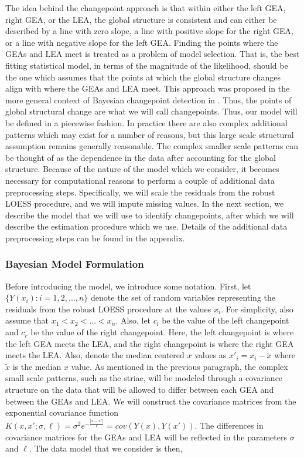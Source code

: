 \documentclass[12pt]{article}
\begin{document}
The idea behind the changepoint approach is that within either the left
GEA, right GEA, or the LEA, the global structure is consistent and can
either be described by a line with zero slope, a line with positive
slope for the right GEA, or a line with negative slope for the left GEA.
Finding the points where the GEAs and LEA meet is treated as a problem
of model selection. That is, the best fitting statistical model, in
terms of the magnitude of the likelihood, should be the one which
assumes that the points at which the global structure changes align with
where the GEAs and LEA meet. This approach was proposed in the more
general context of Bayesian changepoint detection in
\citet{stephens1994}. Thus, the points of global structural change are
what we will call changepoints. Thus, our model will be defined in a
piecewise fashion. In practice there are also complex additional
patterns which may exist for a number of reasons, but this large scale
structural assumption remains generally reasonable. The complex smaller
scale patterns can be thought of as the dependence in the data after
accounting for the global structure. Because of the nature of the model
which we consider, it becomes necessary for computational reasons to
perform a couple of additional data preprocessing steps. Specifically,
we will scale the residuals from the robust LOESS procedure, and we will
impute missing values. In the next section, we describe the model that
we will use to identify changepoints, after which we will describe the
estimation procedure which we use. Details of the additional data
preprocessing steps can be found in the appendix.

\subsubsection{Bayesian Model Formulation}

Before introducing the model, we introduce some notation. First, let
\(\{Y(x_i): i = 1,2, ..., n\}\) denote the set of random variables
representing the residuals from the robust LOESS procedure at the values
\(x_i\). For simplicity, also assume that \(x_1 < x_2 < ... < x_n\).
Also, let \(c_l\) be the value of the left changepoint and \(c_r\) be
the value of the right changepoint. Here, the left changepoint is where
the left GEA meets the LEA, and the right changepoint is where the right
GEA meets the LEA. Also, denote the median centered \(x\) values as
\(x'_i = x_i - \tilde{x}\) where \(\tilde{x}\) is the median \(x\)
value. As mentioned in the previous paragraph, the complex small scale
patterns, such as the striae, will be modeled through a covariance
structure on the data that will be allowed to differ between each GEA
and between the GEAs and LEA. We will construct the covariance matrices
from the exponential covariance function
\(K(x, x';\sigma, \ell) = \sigma^2 e^{-\frac{|x - x'|}{\ell}} = cov(Y(x), Y(x'))\).
The differences in covariance matrices for the GEAs and LEA will be
reflected in the parameters \(\sigma\) and \(\ell\). The data model that
we consider is then,
\end{document}
